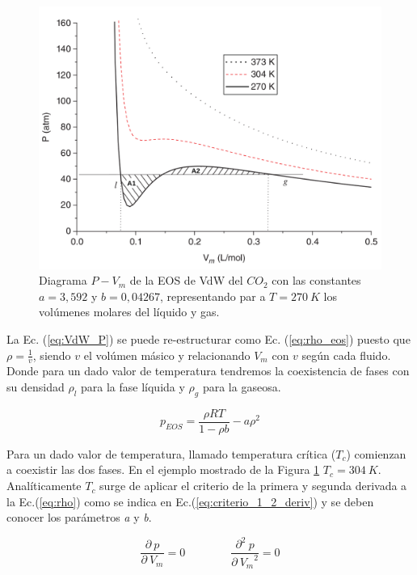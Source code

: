 \begin{figure}[htbp]
	\centering
	\includegraphics[width=.8\textwidth]{figs/cap4/Diagrama_P_V_del_CO2_Multiphase_LBM}
	\caption{Diagrama $P - V_m$ de la EOS de VdW del $CO_2$ con las constantes $a = 3,592$ y $b = 0,04267$, representando par a $T = 270 \> K$ los volúmenes molares del líquido y gas. \cite{huang2015multiphase}}
	\label{fig:P_V_CO2}	
\end{figure}


La Ec. (\ref{eq:VdW_P}) se puede re-estructurar como Ec. (\ref{eq:rho_eos}) puesto que $\rho = \frac{1}{v}$, siendo $v$ el volúmen másico y relacionando $V_m$ con $v$ según cada fluido. Donde para un dado valor de temperatura tendremos la coexistencia de fases con su densidad $\rho_l$ para la fase líquida y $\rho_g$ para la gaseosa.

\begin{equation*}
p_{EOS} = \frac{\rho R T}{1- \rho b} - a {\rho}^{2} \nonumber 
\end{equation*}

Para un dado valor de temperatura, llamado temperatura crítica (\textit{$T_c$}) comienzan a coexistir las dos fases. En el ejemplo mostrado de la Figura \ref{fig:P_V_CO2} $T_c = 304 \> K$. Analíticamente $T_c$ surge de aplicar el criterio de la primera y segunda derivada a la Ec.(\ref{eq:rho}) como se indica en Ec.(\ref{eq:criterio_1_2_deriv}) y se deben conocer los parámetros \textit{a} y \textit{b}.

\begin{equation}
	\frac{\partial\> p}{\partial\> V_{m}} = 0 \qquad \qquad \frac{\partial^{2} \> p}{\partial\> {V_{m}}^{2}} = 0
	\label{eq:criterio_1_2_deriv}
\end{equation}


